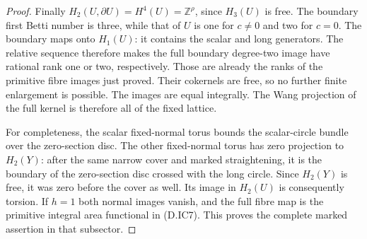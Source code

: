 \begin{proof}
Finally $H_2(U,\partial U)=H^4(U)=\mathbb Z^\rho$,
since $H_3(U)$ is free. The boundary first Betti
number is three, while that of $U$ is one for
$c\ne0$ and two for $c=0$. The boundary maps onto
$H_1(U)$: it contains the scalar and long generators.
The relative sequence therefore makes the full
boundary degree-two image have rational rank one
or two, respectively. Those are already the ranks
of the primitive fibre images just proved. Their
cokernels are free, so no further finite enlargement
is possible. The images are equal integrally.
The Wang projection of the full kernel is therefore
all of the fixed lattice.

For completeness, the scalar fixed-normal torus
bounds the scalar-circle bundle over the zero-section
disc. The other fixed-normal torus has zero projection
to $H_2(Y)$: after the same narrow cover and marked
straightening, it is the boundary of the zero-section
disc crossed with the long circle. Since $H_2(Y)$
is free, it was zero before the cover as well.
Its image in $H_2(U)$ is consequently torsion.
If $h=1$ both normal images vanish, and the full
fibre map is the primitive integral area functional
in (D.IC7). This proves the complete marked assertion
in that subsector.
\end{proof}
